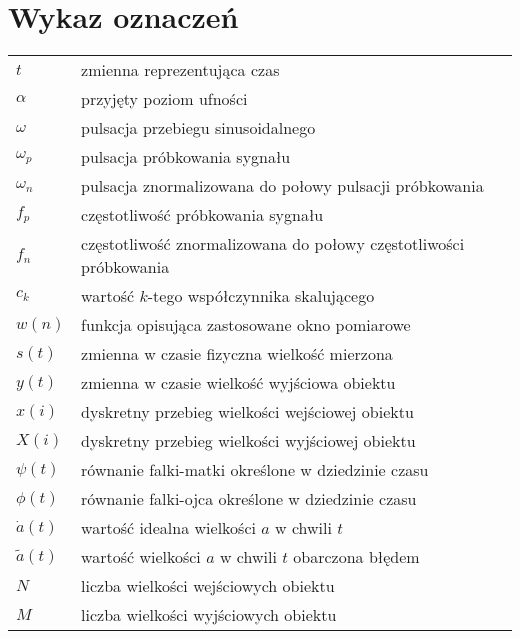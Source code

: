 \chapter*{Wykaz oznaczeń}

\begin{longtable}[l]{ l @{~~--~~} p{368pt} }
$t$                             & zmienna reprezentująca czas \\
$\alpha$                        & przyjęty poziom ufności \\
$\omega$                        & pulsacja przebiegu sinusoidalnego \\
$\omega_{p}$                    & pulsacja próbkowania sygnału \\
$\omega_{n}$                    & pulsacja znormalizowana do połowy pulsacji próbkowania \\
$f_{p}$                         & częstotliwość próbkowania sygnału \\
$f_{n}$                         & częstotliwość znormalizowana do połowy częstotliwości próbkowania \\
$c_{k}$                         & wartość $k$-tego współczynnika skalującego \\
$w(n)$                          & funkcja opisująca zastosowane okno pomiarowe \\
$s(t)$                          & zmienna w czasie fizyczna wielkość mierzona \\
$y(t)$                          & zmienna w czasie wielkość wyjściowa obiektu \\
$x(i)$                          & dyskretny przebieg wielkości wejściowej obiektu \\
$X(i)$                          & dyskretny przebieg wielkości wyjściowej obiektu \\
$\psi(t)$                       & równanie falki-matki określone w dziedzinie czasu \\
$\phi(t)$                       & równanie falki-ojca określone w dziedzinie czasu \\
$\dot{a}(t)$                    & wartość idealna wielkości $a$ w chwili $t$ \\
$\tilde{a}(t)$                  & wartość wielkości $a$ w chwili $t$ obarczona błędem \\
$N$                             & liczba wielkości wejściowych obiektu \\
$M$                             & liczba wielkości wyjściowych obiektu \\

\end{longtable}
